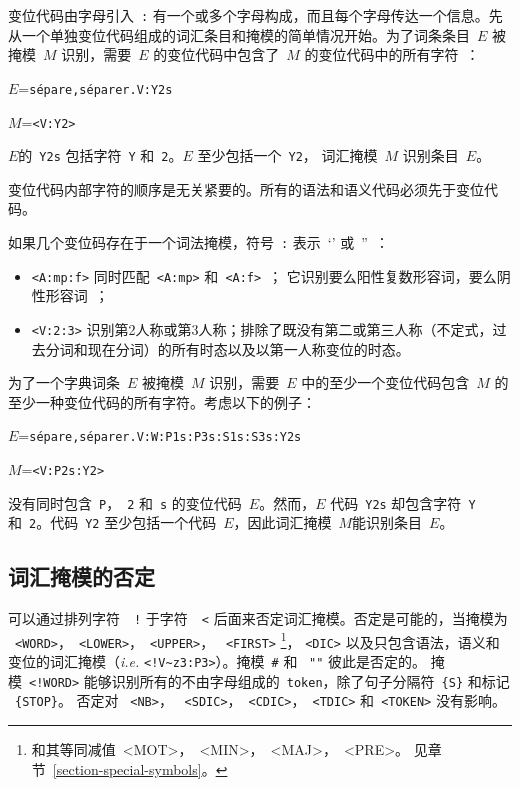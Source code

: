 \noindent 变位代码由字母引入\ \verb+:+ 有一个或多个字母构成，而且每个字母传达一个信息。先从一个单独变位代码组成的词汇条目和掩模的简单情况开始。为了词条条目\ $E$ 被掩模\ $M$ 识别，需要\ $E$ 的变位代码中包含了\ $M$ 的变位代码中的所有字符~：

\bigskip
$E$=\verb$sépare,séparer.V:Y2s$

$M$=\verb$<V:Y2>$

\bigskip
\noindent $E$的\ \verb+Y2s+ 包括字符\ \verb+Y+ 和\ \verb+2+。$E$ 至少包括一个\ \verb+Y2+， 词汇掩模\ $M$ 识别条目\ $E$。

\bigskip
\noindent 变位代码内部字符的顺序是无关紧要的。所有的语法和语义代码必须先于变位代码。 

\bigskip
\noindent 如果几个变位码存在于一个词法掩模，符号\ \verb+:+ 表示\ `' 或\ ''~：

\begin{itemize}
  \item \verb+<A:mp:f>+ 同时匹配\ \verb+<A:mp>+ 和\ \verb+<A:f>+~； 它识别要么阳性复数形容词，要么阴性形容词~；
  \item \verb+<V:2:3>+ 识别第2人称或第3人称；排除了既没有第二或第三人称（不定式，过去分词和现在分词）的所有时态以及以第一人称变位的时态。 
\end{itemize}

\noindent 为了一个字典词条\ $E$ 被掩模\ $M$ 识别，需要\ $E$ 中的至少一个变位代码包含\ $M$ 的至少一种变位代码的所有字符。考虑以下的例子：

\bigskip
$E$=\verb$sépare,séparer.V:W:P1s:P3s:S1s:S3s:Y2s$

$M$=\verb$<V:P2s:Y2>$

\bigskip
\noindent  没有同时包含\ \verb+P+，\ \verb+2+ 和\ \verb+s+ 的变位代码\ $E$。然而，$E$ 代码\ \verb+Y2s+ 却包含字符\ \verb+Y+ 和\ \verb+2+。代码\ \verb+Y2+ 至少包括一个代码\ $E$，因此词汇掩模\ $M$能识别条目\ $E$。


\subsection{词汇掩模的否定}
可以通过排列字符~\ \verb+!+ 于字符~\ \verb+<+ 后面来否定词汇掩模。否定是可能的，当掩模为 \ \verb+<WORD>+，\ \verb+<LOWER>+，\ \verb+<UPPER>+，
\ \verb+<FIRST>+ \footnote{和其等同减值\ <MOT>，\ <MIN>，\  <MAJ>，\ <PRE>。 见章节~\ref{section-special-symbols}。}，
\verb+<DIC>+  以及只包含语法，语义和变位的词汇掩模（\textit{i.e.} \verb$<!V~z3:P3>$）。掩模\ \verb+#+ 和 \ \verb+""+ 彼此是否定的。  
\index{\verb+#+}
掩模\ \verb$<!WORD>$ 能够识别所有的不由字母组成的\ \verb+token+，除了句子分隔符\ \verb+{S}+ 和标记 \ \verb+{STOP}+。
否定对 \ \verb+<NB>+， \ \verb+<SDIC>+，\ \verb+<CDIC>+，\ \verb+<TDIC>+ 和\ \verb+<TOKEN>+ 没有影响。

